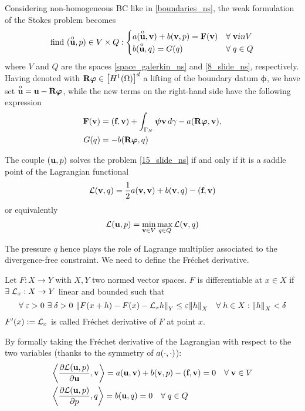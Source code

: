 Considering non-homogeneous BC like in \eqref{boundaries_ns}, the weak formulation of the Stokes problem becomes
\begin{equation}
    \text{find } (\overset{\mathrm{o}}{\textbf{u}}, p) \in V \times Q: 
    \begin{cases}
        a(\overset{\mathrm{o}}{\textbf{u}}, \textbf{v}) + b(\textbf{v}, p) = \textbf{F}(\textbf{v}) & \forall \; \textbf{v} in V \\
        b(\overset{\mathrm{o}}{\textbf{u}}, q) = G(q) &\forall \; q \in Q
    \end{cases}
    \label{16_slide_ns}
\end{equation}
where \(V\) and \(Q\) are the spaces \eqref{space_galerkin_ns} and \eqref{8_slide_ns}, respectively. Having denoted with \(\textbf{R}\bm{\varphi} \in \left[ H^1(\Omega) \right]^d\) a lifting of the boundary datum \(\bm{\phi}\), we have set \(\overset{\mathrm{o}}{\textbf{u}} = \textbf{u} -\textbf{R}\bm{\varphi}\), while the new terms on the right-hand side have the following expression
\begin{equation}
    \begin{aligned}
        \textbf{F}(\textbf{v}) &= (\textbf{f}, \textbf{v}) + \int_{\Gamma_N} \bm{\psi}\textbf{v} \, d\gamma - a(\textbf{R}\bm{\varphi}, \textbf{v}), \\
        G(q) &= -b(\textbf{R}\bm{\varphi}, q)
    \end{aligned}
    \label{17_slide_ns}
\end{equation}
\begin{theorem}
    The couple \((\textbf{u}, p)\) solves the problem \eqref{15_slide_ns} if and only if it is a saddle point of the Lagrangian functional 
    \[
        \mathcal{L}(\textbf{v}, q) = \frac{1}{2} a(\textbf{v},\textbf{v}) + b(\textbf{v},q) - (\textbf{f}, \textbf{v})    
    \]
    or equivalently 
    \[
        \mathcal{L}(\textbf{u}, p) = \min_{\textbf{v} \in V} \max_{q \in Q} \mathcal{L} (\textbf{v}, q)    
    \]
\end{theorem}
The pressure \(q\) hence plays the role of Lagrange multiplier associated to the divergence-free constraint. 
We need to define the Fréchet derivative. 
\begin{definition}
    Let \(F:X\to Y\) with \(X,Y\) two normed vector spaces. \(F\) is differentiable at \(x \in X\) if \(\exists \; \mathcal{L}_x: X\to Y\) linear and bounded such that 
    \[
        \forall \; \varepsilon > 0 \ \exists \; \delta > 0 \ \norm{F(x+h) - F(x) - \mathcal{L}_x h}_Y \leq \varepsilon\norm{h}_X \quad \forall \; h \in X : \norm{h}_X < \delta
    \]
    \(F'(x) := \mathcal{L}_x\) is called Fréchet derivative of \(F\) at point \(x\).
\end{definition}
By formally taking the Fréchet derivative of the Lagrangian with respect to the two variables (thanks to the symmetry of \(a(\cdot, \cdot)\)): 
\begin{align*}
    &\bigg\langle\partialderivative{\loperator(\uvec, p)}{\uvec}, \vvec \bigg\rangle = a(\uvec, \vvec) +b(\vvec,p) -(\vect{f},\vvec) = 0 \quad \forall \; \vvec \in V \\
    &\bigg\langle \partialderivative{\loperator(\uvec,p)}{p}, q\bigg\rangle = b(\uvec, q) = 0 \quad \forall \; q \in Q 
\end{align*}
